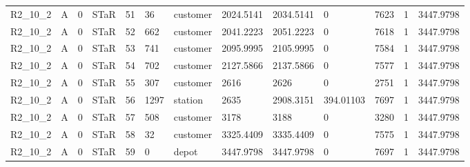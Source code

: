 \begin{longtable}{lllllllllllll}
R2\_10\_2 & A & 0 & STaR & 51 & 36 & customer & 2024.5141 & 2034.5141 & 0 & 7623 & 1 & 3447.9798 \\
R2\_10\_2 & A & 0 & STaR & 52 & 662 & customer & 2041.2223 & 2051.2223 & 0 & 7618 & 1 & 3447.9798 \\
R2\_10\_2 & A & 0 & STaR & 53 & 741 & customer & 2095.9995 & 2105.9995 & 0 & 7584 & 1 & 3447.9798 \\
R2\_10\_2 & A & 0 & STaR & 54 & 702 & customer & 2127.5866 & 2137.5866 & 0 & 7577 & 1 & 3447.9798 \\
R2\_10\_2 & A & 0 & STaR & 55 & 307 & customer & 2616 & 2626 & 0 & 2751 & 1 & 3447.9798 \\
R2\_10\_2 & A & 0 & STaR & 56 & 1297 & station & 2635 & 2908.3151 & 394.01103 & 7697 & 1 & 3447.9798 \\
R2\_10\_2 & A & 0 & STaR & 57 & 508 & customer & 3178 & 3188 & 0 & 3280 & 1 & 3447.9798 \\
R2\_10\_2 & A & 0 & STaR & 58 & 32 & customer & 3325.4409 & 3335.4409 & 0 & 7575 & 1 & 3447.9798 \\
R2\_10\_2 & A & 0 & STaR & 59 & 0 & depot & 3447.9798 & 3447.9798 & 0 & 7697 & 1 & 3447.9798 \\
\hline
\end{longtable}

